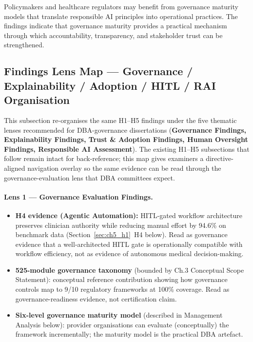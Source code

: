 \noindent Policymakers and healthcare regulators may benefit from governance maturity models that translate responsible AI principles into operational practices. The findings indicate that governance maturity provides a practical mechanism through which accountability, transparency, and stakeholder trust can be strengthened.

\subsection{Findings Lens Map --- Governance / Explainability / Adoption / HITL / RAI Organisation}
\label{sec:findings_lens_map}

This subsection re-organises the same H1--H5 findings under the five thematic lenses recommended for DBA-governance dissertations (\textbf{Governance Findings, Explainability Findings, Trust \& Adoption Findings, Human Oversight Findings, Responsible AI Assessment}). The existing H1--H5 subsections that follow remain intact for back-reference; this map gives examiners a directive-aligned navigation overlay so the same evidence can be read through the governance-evaluation lens that DBA committees expect.

\paragraph{Lens 1 --- Governance Evaluation Findings.}
\label{para:lens_governance}
\begin{itemize}[leftmargin=*, itemsep=3pt]
    \item \textbf{H4 evidence (Agentic Automation):} HITL-gated workflow architecture preserves clinician authority while reducing manual effort by 94.6\% on benchmark data (Section~\ref{sec:ch5_h1}~H4 below). Read as governance evidence that a well-architected HITL gate is operationally compatible with workflow efficiency, not as evidence of autonomous medical decision-making.
    \item \textbf{525-module governance taxonomy} (bounded by Ch.3 Conceptual Scope Statement): conceptual reference contribution showing how governance controls map to 9/10 regulatory frameworks at 100\% coverage. Read as governance-readiness evidence, not certification claim.
    \item \textbf{Six-level governance maturity model} (described in Management Analysis below): provider organisations can evaluate (conceptually) the framework incrementally; the maturity model is the practical DBA artefact.
\end{itemize}

